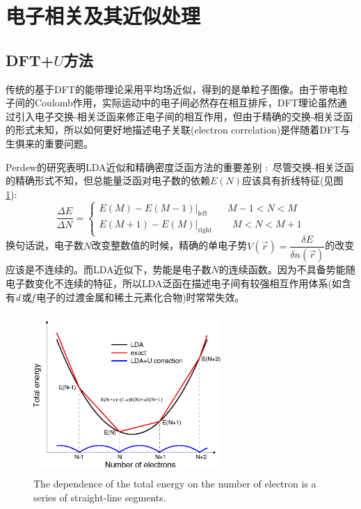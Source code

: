 {\section{电子相关及其近似处理}
\subsection{DFT+$U$方法}
传统的基于DFT的能带理论采用平均场近似，得到的是单粒子图像。由于带电粒子间的\textrm{Coulomb}作用，实际运动中的电子间必然存在相互排斥，\textrm{DFT}理论虽然通过引入电子交换-相关泛函来修正电子间的相互作用，但由于精确的交换-相关泛函的形式未知，所以如何更好地描述电子关联(electron correlation)是伴随着\textrm{DFT}与生俱来的重要问题。

\textrm{Perdew}的研究表明LDA近似和精确密度泛函方法的重要差别%
:~尽管交换-相关泛函的精确形式不知，但总能量泛函对电子数的依赖$E(N)$应该具有折线特征(见图\ref{exact-DFT}):~
	\begin{displaymath}
		\dfrac{\Delta E}{\Delta N}=\left\{
		\begin{aligned}
			E(M)-E(M-1)|_{\mathrm{left}}\qquad M-1<N<M\\
			E(M+1)-E(M)|_{\mathrm{right}}\qquad M<N<M+1 
		\end{aligned}\right.
	\end{displaymath}
换句话说，电子数$N$改变整数值的时候，精确的单电子势$V(\vec r)=\dfrac{\delta E}{\delta n(\vec r)}$的改变应该是不连续的。而LDA近似下，势能是电子数$N$的连续函数。因为不具备势能随电子数变化不连续的特征，所以LDA泛函在描述电子间有较强相互作用体系(如含有{\textit d}\,或{\textit f}\,电子的过渡金属和稀土元素化合物)时常常失效。

\begin{figure}[h!]
\centering
\vspace*{-0.1in}
\includegraphics[height=2.4in,width=2.8in,viewport=0 0 1100 880,clip]{Figures/Koopmans-condition_LDA-U.png}
\caption{\small \textrm{The dependence of the total energy on the number of electron is a series of straight-line segments.}}%
\label{exact-DFT}
\end{figure}

}
